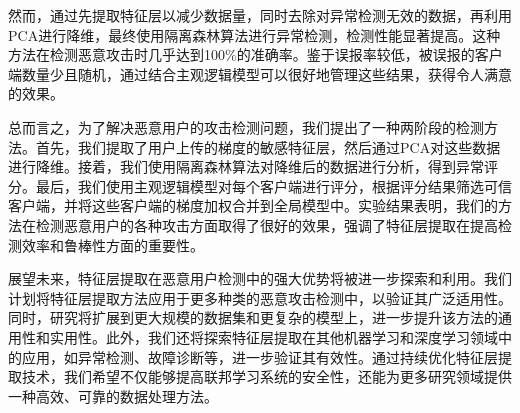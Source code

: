 \documentclass[conference]{IEEEtran}
\begin{document}
然而，通过先提取特征层以减少数据量，同时去除对异常检测无效的数据，再利用PCA进行降维，最终使用隔离森林算法进行异常检测，检测性能显著提高。这种方法在检测恶意攻击时几乎达到100\%的准确率。鉴于误报率较低，被误报的客户端数量少且随机，通过结合主观逻辑模型可以很好地管理这些结果，获得令人满意的效果。

总而言之，为了解决恶意用户的攻击检测问题，我们提出了一种两阶段的检测方法。首先，我们提取了用户上传的梯度的敏感特征层，然后通过PCA对这些数据进行降维。接着，我们使用隔离森林算法对降维后的数据进行分析，得到异常评分。最后，我们使用主观逻辑模型对每个客户端进行评分，根据评分结果筛选可信客户端，并将这些客户端的梯度加权合并到全局模型中。实验结果表明，我们的方法在检测恶意用户的各种攻击方面取得了很好的效果，强调了特征层提取在提高检测效率和鲁棒性方面的重要性。

展望未来，特征层提取在恶意用户检测中的强大优势将被进一步探索和利用。我们计划将特征层提取方法应用于更多种类的恶意攻击检测中，以验证其广泛适用性。同时，研究将扩展到更大规模的数据集和更复杂的模型上，进一步提升该方法的通用性和实用性。此外，我们还将探索特征层提取在其他机器学习和深度学习领域中的应用，如异常检测、故障诊断等，进一步验证其有效性。通过持续优化特征层提取技术，我们希望不仅能够提高联邦学习系统的安全性，还能为更多研究领域提供一种高效、可靠的数据处理方法。













\end{document}
